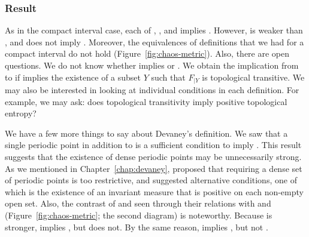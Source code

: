 \documentclass[10pt,twoside,draft]{book}
\begin{document}
\subsubsection*{Result}
As in the compact interval case, each of \dev, \blcp, and \pte implies \liy.
However, \wig is weaker than \dev, and does not imply \liy.
Moreover, the equivalences of definitions that we had for a compact interval do not hold (Figure~\ref{fig:chaos-metric}).
Also, there are open questions.
We do not know whether \pte implies \blcp or \dev.
We obtain the implication from \pte to \wig if \pte implies the existence of a subset $Y$ such that $F_{|Y}$ is topological transitive.
We may also be interested in looking at individual conditions in each definition.
For example, we may ask: does topological transitivity imply positive topological entropy?

We have a few more things to say about Devaney's definition.
We saw that a single periodic point in addition to \wig is a sufficient condition to imply \liy. 
This result suggests that the existence of dense periodic points may be unnecessarily strong.
As we mentioned in Chapter~\ref{chap:devaney}, \citet{glasner} proposed that requiring a dense set of periodic points is too restrictive, and suggested alternative conditions, one of which is the existence of an invariant measure that is positive on each non-empty open set.
Also, the contrast of \dev and \wig seen through their relations with \pte and \liy (Figure~\ref{fig:chaos-metric}; the second diagram) is noteworthy.
Because \dev is stronger, \dev implies \liy, but \wig does not.
By the same reason, \blcp implies \wig, but not \dev.




\printindex

%
\end{document}
